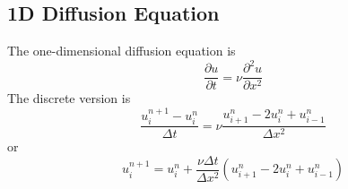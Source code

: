 \documentclass[../../../main.tex]{subfiles}
\begin{document}
\subsection{1D Diffusion Equation}
The one-dimensional diffusion equation is
\begin{equation*}
    \frac{\partial u}{\partial t}= \nu \frac{\partial^2 u}{\partial x^2}
\end{equation*}
The discrete version is 
\begin{equation*}
    \frac{u_{i}^{n+1}-u_{i}^{n}}{\Delta t}=\nu\frac{u_{i+1}^{n}-2u_{i}^{n}+u_{i-1}^{n}}{\Delta x^2}
\end{equation*}
or 
\begin{equation*}
    u_{i}^{n+1}=u_{i}^{n}+\frac{\nu\Delta t}{\Delta x^2}(u_{i+1}^{n}-2u_{i}^{n}+u_{i-1}^{n})
\end{equation*}
\end{document}
